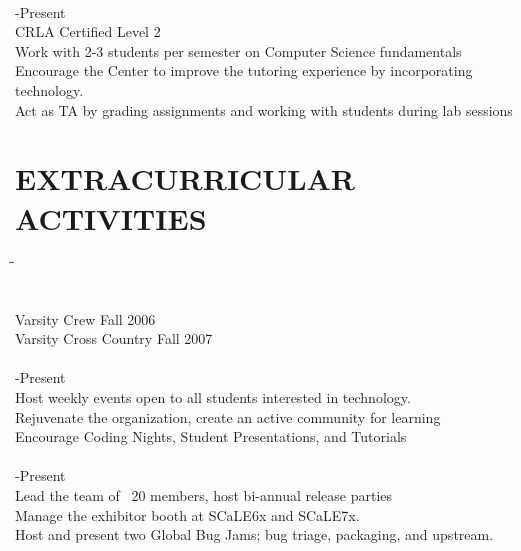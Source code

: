 \documentclass{res}
\begin{document}
\begin{resume}
\begin{tabbing}
\\

   \hspace{-0.25in}{\bf Math/Computer Science Tutor, Chapman University Center for Academic Success} \> -Present\\
	 CRLA Certified Level 2\\
	 Work with 2-3 students per semester on Computer Science fundamentals\\
	 Encourage the Center to improve the tutoring experience by incorporating technology.\\
	 Act as TA by grading assignments and working with students during lab sessions\\
	\end{tabbing}
 
\section{EXTRACURRICULAR ACTIVITIES}          
	\vspace{-5pt}
   \begin{tabbing}
   \hspace{2.5in}\= \hspace{3.45in}\= \kill %

    \hspace{-0.25in}{\bf Chapman University Athletics}\\
	Varsity Crew \> \>\hspace{0.2in}Fall 2006\\
	Varsity Cross Country \> \>\hspace{0.2in}Fall 2007\\

\\

    \hspace{-0.25in}{\bf President, Chapman University ACM} \> -Present\\
	 Host weekly events open to all students interested in technology.\\
	 Rejuvenate the organization, create an active community for learning \\
	 Encourage Coding Nights, Student Presentations, and Tutorials\\

\\

    \hspace{-0.25in}{\bf Community Leader, Ubuntu California Local Community Team} \> -Present\\
	Lead the team of ~20 members, host bi-annual release parties \\
	Manage the exhibitor booth at SCaLE6x and SCaLE7x. \\
	Host and present two Global Bug Jams; bug triage, packaging, and upstream. \\


\end{tabbing}
\end{resume}
\end{document}
